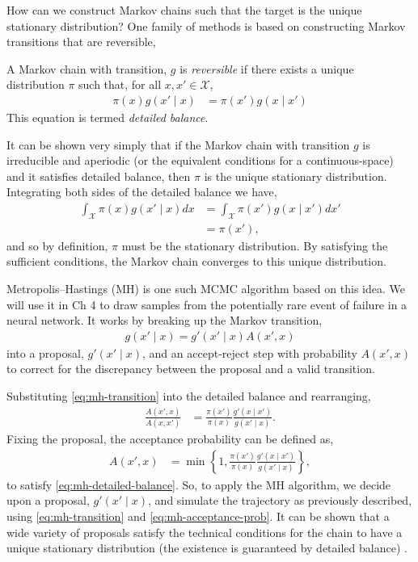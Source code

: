 How can we construct Markov chains such that the target is the unique stationary distribution? One family of methods is based on constructing Markov transitions that are reversible,
\begin{definition}
	A Markov chain with transition, $g$ is \emph{reversible} if there exists a unique distribution $\pi$ such that, for all $x,x'\in\mathcal{X}$,
	\begin{align*}
		\pi(x)g(x'\mid x) &= \pi(x')g(x\mid x')
	\end{align*}
	This equation is termed \emph{detailed balance}.
\end{definition}
It can be shown very simply that if the Markov chain with transition $g$ is irreducible and aperiodic (or the equivalent conditions for a continuous-space) and it satisfies detailed balance, then $\pi$ is the unique stationary distribution. Integrating both sides of the detailed balance we have,
\begin{align*}
	\int_\mathcal{X}\pi(x)g(x'\mid x)dx &= \int_\mathcal{X}\pi(x')g(x\mid x')dx'\\
	&= \pi(x'),
\end{align*}
and so by definition, $\pi$ must be the stationary distribution. By satisfying the sufficient conditions, the Markov chain converges to this unique distribution.

Metropolis--Hastings (MH) \citep{gilks1995markov} is one such MCMC algorithm based on this idea. We will use it in Ch 4 to draw samples from the potentially rare event of failure in a neural network. It works by breaking up the Markov transition,
\begin{align}\label{eq:mh-transition}
	g(x'\mid x)=g'(x'\mid x)A(x',x)
\end{align}
into a proposal, $g'(x'\mid x)$, and an accept-reject step with probability $A(x',x)$ to correct for the discrepancy between the proposal and a valid transition.

Substituting \eqref{eq:mh-transition} into the detailed balance and rearranging,
\begin{align}\label{eq:mh-detailed-balance}
	\frac{A(x',x)}{A(x,x')} &= \frac{\pi(x')}{\pi(x)}\frac{g'(x\mid x')}{g(x'\mid x)}.
\end{align}
Fixing the proposal, the acceptance probability can be defined as,
\begin{align}\label{eq:mh-acceptance-prob}
	A(x',x) &= \min\left\{1, \frac{\pi(x')}{\pi(x)}\frac{g'(x\mid x')}{g(x'\mid x)}\right\},
\end{align}
to satisfy \eqref{eq:mh-detailed-balance}. So, to apply the MH algorithm, we decide upon a proposal, $g'(x'\mid x)$, and simulate the trajectory as previously described, using \eqref{eq:mh-transition} and \eqref{eq:mh-acceptance-prob}. It can be shown that a wide variety of proposals satisfy the technical conditions for the chain to have a unique stationary distribution (the existence is guaranteed by detailed balance) \citep{andrieu2003introduction}.

